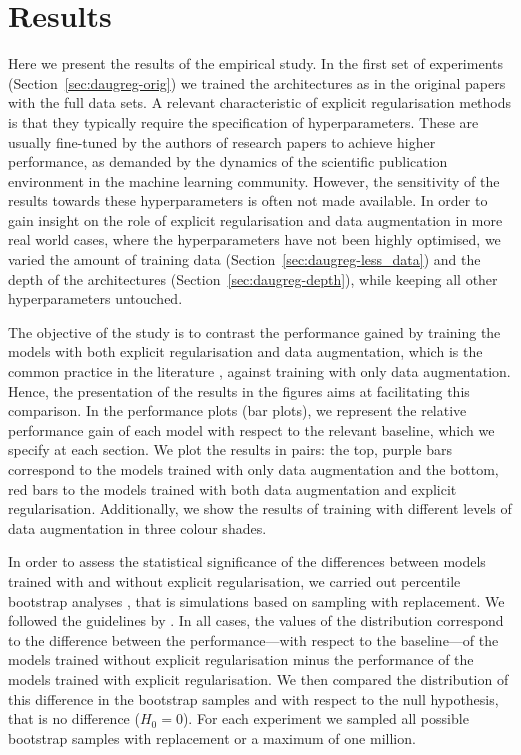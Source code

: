 {\section{Results}
\label{sec:daugreg-results}
Here we present the results of the empirical study. In the first set of experiments (Section~\ref{sec:daugreg-orig}) we trained the architectures as in the original papers with the full data sets. A relevant characteristic of explicit regularisation methods is that they typically require the specification of hyperparameters. These are usually fine-tuned by the authors of research papers to achieve higher performance, as demanded by the dynamics of the scientific publication environment in the machine learning community. However, the sensitivity of the results towards these hyperparameters is often not made available. In order to gain insight on the role of explicit regularisation and data augmentation in more real world cases, where the hyperparameters have not been highly optimised, we varied the amount of training data (Section~\ref{sec:daugreg-less_data}) and the depth of the architectures (Section~\ref{sec:daugreg-depth}), while keeping all other hyperparameters untouched.

The objective of the study is to contrast the performance gained by training the models with both explicit regularisation and data augmentation, which is the common practice in the literature \citep{tan2019efficientnet, huang2017densenet, zagoruyko2016wrn, springenberg2014allcnn}, against training with only data augmentation. Hence, the presentation of the results in the figures aims at facilitating this comparison. In the performance plots (bar plots), we represent the relative performance gain of each model with respect to the relevant baseline, which we specify at each section. We plot the results in pairs: the top, purple bars correspond to the models trained with only data augmentation and the bottom, red bars to the models trained with both data augmentation and explicit regularisation. Additionally, we show the results of training with different levels of data augmentation in three colour shades.

In order to assess the statistical significance of the differences between models trained with and without explicit regularisation, we carried out percentile bootstrap analyses \citep{efron1992bootstrap}, that is simulations based on sampling with replacement. We followed the guidelines by \citep{rousselet2019bootstrap}. In all cases, the values of the distribution correspond to the difference between the performance---with respect to the baseline---of the models trained without explicit regularisation minus the performance of the models trained with explicit regularisation. We then compared the distribution of this difference in the bootstrap samples and with respect to the null hypothesis, that is no difference ($H_0 = 0$). For each experiment we sampled all possible bootstrap samples with replacement or a maximum of one million.

}
